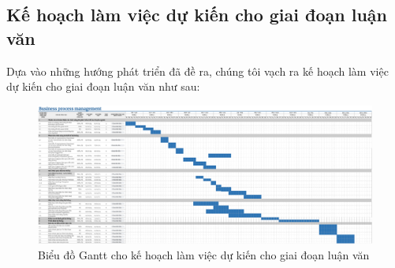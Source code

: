 \subsection{Kế hoạch làm việc dự kiến cho giai đoạn luận văn}
Dựa vào những hướng phát triển đã đề ra, chúng tôi vạch ra kế hoạch làm việc dự kiến cho giai đoạn luận văn như sau:
\begin{figure}[H]
    \centering
    \includegraphics[width=\linewidth]{Content/Kết luận/images/graduteschedule.png}
    \vspace{0.5cm}
    \caption{Biểu đồ Gantt cho kế hoạch làm việc dự kiến cho giai đoạn luận văn}
    \label{fig:Biểu đồ Gantt cho kế hoạch làm việc dự kiến cho giai đoạn luận văn}
\end{figure}